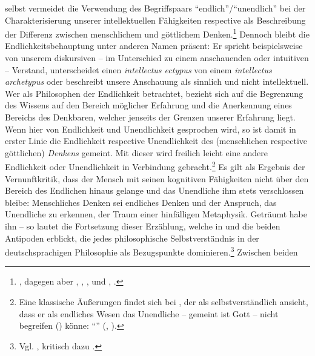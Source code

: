  selbst vermeidet die Verwendung des Begriffspaars
\enquote{endlich}/\enquote{unendlich} bei der Charakterisierung unserer
intellektuellen Fähigkeiten respective als Beschreibung der Differenz zwischen
menschlichem und göttlichem
Denken.\footnote{\cite[Vgl.][]{Kant:DereinzigmoeglicheBeweisgrundvomDaseinGottes1977} \cite[][II: 154.4--9]{Kant:GesammelteWerke1900ff.}, dagegen aber
\cite{Kant:KritikderreinenVernunft2003}, \cite[][III:
72.29--73.4]{Kant:GesammelteWerke1900ff.},
\cite{Kant:KritikderpraktischenVernunft1974}, \cite[][V:
32.35--33.5]{Kant:GesammelteWerke1900ff.} und
\cite[][\S~87]{Kant:KritikderUrteilskraft2009}, \cite[][V:
450.10--12]{Kant:GesammelteWerke1900ff.}.} Dennoch bleibt die
Endlichkeitsbehauptung unter anderen Namen präsent:
Er spricht beispielsweise von unserem diskursiven -- im Unterschied zu einem anschauenden oder intuitiven
-- Verstand, unterscheidet einen \emph{intellectus ectypus} von einem \emph{intellectus
archetypus} oder beschreibt unsere Anschauung als sinnlich und nicht
intellektuell. Wer  als Philosophen der Endlichkeit
betrachtet, bezieht sich auf die Begrenzung des Wissens auf den Bereich
möglicher Erfahrung und die Anerkennung eines Bereichs des Denkbaren, welcher
jenseits der Grenzen unserer Erfahrung liegt. Wenn hier von Endlichkeit und
Unendlichkeit gesprochen wird, so ist damit in erster Linie die Endlichkeit
respective Unendlichkeit des (menschlichen respective göttlichen) \emph{Denkens}
gemeint. Mit dieser wird freilich leicht eine andere Endlichkeit oder
Unendlichkeit in Verbindung
gebracht.\footnote{Eine klassische Äußerungen findet sich bei
, der als selbstverständlich
ansieht, dass er als endliches Wesen das Unendliche -- gemeint ist Gott --
nicht begreifen () könne:
\enquote{} \mkbibparens{\cite{Descartes:OeuvresdeDescartes1983},
\cite{Descartes:OeuvresdeDescartes1983}}.} Es gilt als Ergebnis der
Vernunftkritik, dass der Mensch mit seinen kognitiven Fähigkeiten nicht über den Bereich des Endlichen hinaus gelange und das Unendliche ihm stets verschlossen bleibe: Menschliches Denken sei endliches Denken und der Anspruch, das Unendliche zu erkennen, der Traum einer hinfälligen Metaphysik.
Geträumt habe ihn  -- so lautet die Fortsetzung dieser Erzählung,
welche in  und  die beiden Antipoden erblickt, die jedes
philosophische Selbstverständnis in der deutschsprachigen Philosophie als
Bezugspunkte dominieren.\footnote{Vgl.
\cite{Habermas:WegederDetranszendentalisierung2004,Schnaedelbach:WirKantianer2005},
kritisch dazu \cite[][11--24]{Pleines:VonKantzuHegel2007}.} Zwischen beiden
